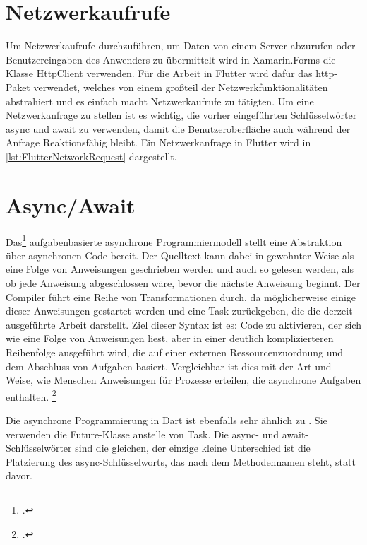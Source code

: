 \section{Netzwerkaufrufe}
Um Netzwerkaufrufe durchzuführen, um Daten von einem Server abzurufen oder Benutzereingaben des Anwenders zu übermittelt wird in Xamarin.Forms die Klasse HttpClient verwenden. Für die Arbeit in Flutter wird dafür das http-Paket verwendet, welches von einem großteil der Netzwerkfunktionalitäten abstrahiert und es einfach macht Netzwerkaufrufe zu tätigten.  Um eine Netzwerkanfrage zu stellen ist es wichtig, die vorher eingeführten Schlüsselwörter \glq async\grq{} und \glq await\grq{} zu verwenden, damit die Benutzeroberfläche auch während der Anfrage Reaktionsfähig bleibt.  Ein Netzwerkanfrage in Flutter wird in  \ref{lst:FlutterNetworkRequest} dargestellt.




\section{Async/Await}
Das\footcitetext[Quelltext in Anlehnung an][Abgerufen am \today]{Pedley2019} aufgabenbasierte asynchrone Programmiermodell stellt eine Abstraktion über asynchronen Code bereit. Der Quelltext kann dabei in gewohnter Weise als eine Folge von Anweisungen geschrieben werden und auch so gelesen werden, als ob jede Anweisung abgeschlossen wäre, bevor die nächste Anweisung beginnt. Der Compiler führt eine Reihe von Transformationen durch, da möglicherweise einige dieser Anweisungen gestartet werden und eine Task zurückgeben, die die derzeit ausgeführte Arbeit darstellt.
Ziel dieser Syntax ist es: Code zu aktivieren, der sich wie eine Folge von Anweisungen liest, aber in einer deutlich komplizierteren Reihenfolge ausgeführt wird, die auf einer externen Ressourcenzuordnung und dem Abschluss von Aufgaben basiert. Vergleichbar ist dies mit der Art und Weise, wie Menschen Anweisungen für Prozesse erteilen, die asynchrone Aufgaben enthalten.  \footcite[Vgl. MICROSFT Async await][Abgerufen am \today]{GoogleFlutterSharedPreferences2020} 

Die asynchrone Programmierung in Dart ist ebenfalls sehr ähnlich zu \Csharp. Sie verwenden die Future-Klasse anstelle von Task. Die async- und await-Schlüsselwörter sind die gleichen, der einzige kleine Unterschied ist die Platzierung des async-Schlüsselworts, das nach dem Methodennamen steht, statt davor.

